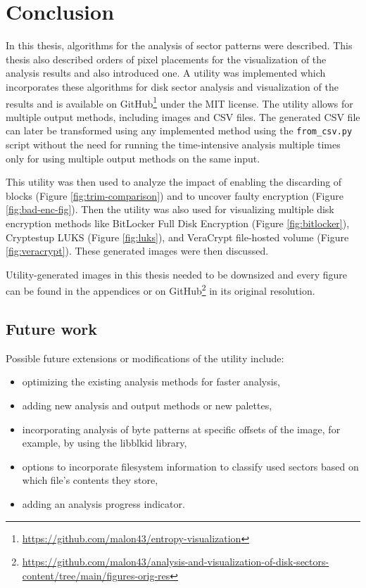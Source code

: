 \documentclass[
  digital, %
  color,   %
  oneside, %
  lof,     %
  nolot,     %
]{fithesis4}
\begin{document}
\chapter{Conclusion}
\label{chap:conclusion}

In this thesis, algorithms for the analysis of sector patterns were described.
This thesis also described orders of pixel placements for the visualization of the analysis results and also introduced one.
A utility was implemented which incorporates these algorithms for disk sector analysis and visualization of the results and is available on GitHub\footnote{\url{https://github.com/malon43/entropy-visualization}} under the MIT license.
The utility allows for multiple output methods, including images and CSV files.
The generated CSV file can later be transformed using any implemented method using the \texttt{from\_csv.py} script without the need for running the time-intensive analysis multiple times only for using multiple output methods on the same input. 

This utility was then used to analyze the impact of enabling the discarding of blocks (Figure \ref{fig:trim-comparison}) and to uncover faulty encryption (Figure \ref{fig:bad-enc-fig}).
Then the utility was also used for visualizing multiple disk encryption methods like BitLocker Full Disk Encryption (Figure \ref{fig:bitlocker}), Cryptestup LUKS (Figure \ref{fig:luks}), and VeraCrypt file-hosted volume (Figure \ref{fig:veracrypt}).
These generated images were then discussed. 

Utility-generated images in this thesis needed to be downsized and every figure can be found in the appendices or on GitHub\footnote{\url{https://github.com/malon43/analysis-and-visualization-of-disk-sectors-content/tree/main/figures-orig-res}} in its original resolution.

\section{Future work}
\label{sec:future-work}

Possible future extensions or modifications of the utility include:
\begin{itemize}[itemsep=-1.8359375pt]
  \item optimizing the existing analysis methods for faster analysis,
  \item adding new analysis and output methods or new palettes,
  \item incorporating analysis of byte patterns at specific offsets of the image, for example, by using the libblkid library\cite{libblkid},
  \item options to incorporate filesystem information to classify used sectors based on which file's contents they store,
  \item adding an analysis progress indicator.
\end{itemize}
\end{document}
